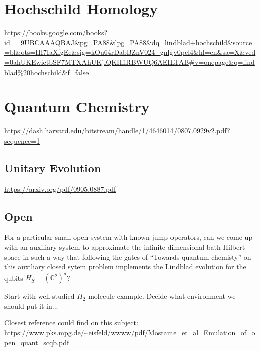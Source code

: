 \documentclass[11pt]{article}
\theoremstyle{change}
\theoremstyle{nonumberplain}
\numberwithin{equation}{section}
\begin{document}
\section{Hochschild Homology}

\url{https://books.google.com/books?id=_9UBCAAAQBAJ&pg=PA88&lpg=PA88&dq=lindblad+hochschild&source=bl&ots=HI7IaXfgEe&sig=kOu64rDabBZnV024_gnlgv0pcl4&hl=en&sa=X&ved=0ahUKEwictbSF7MTXAhUKjlQKHfiRBWUQ6AEILTAB#v=onepage&q=lindblad\%20hochschild&f=false}

\section{Quantum Chemistry}

\url{https://dash.harvard.edu/bitstream/handle/1/4646014/0807.0929v2.pdf?sequence=1}

\subsection{Unitary Evolution}

\url{https://arxiv.org/pdf/0905.0887.pdf}

\subsection{Open}

For a particular small open system with known jump operators, can we come up with an auxiliary system to approximate the infinite dimensional bath Hilbert space in such a way that following the gates of ``Towards quantum chemisty'' on this auxiliary closed sytem problem implements the Lindblad evolution for the qubits $H_S = (\mathbb{C}^2)^d$?

Start with well studied $H_2$ molecule example. Decide what environment we should put it in...

Closest reference could find on this subject:
\url{https://www.pks.mpg.de/~eisfeld/wwww/pdf/Mostame_et_al_Emulation_of_open_quant_scqb.pdf}
\end{document}
